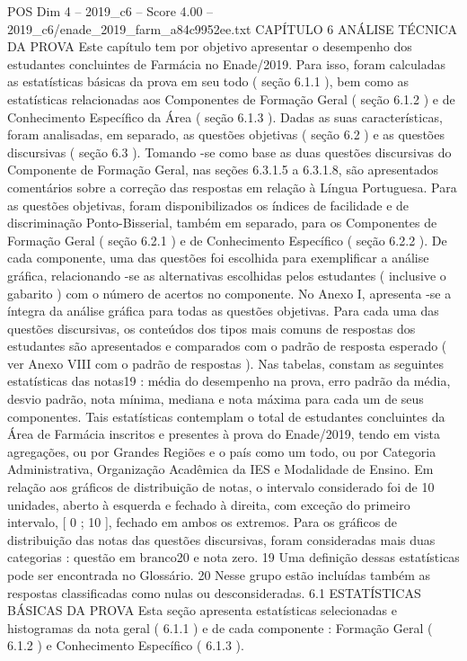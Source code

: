 \begin{textsample}{POS Dim 4 – 2019\_c6 – Score 4.00 – 2019\_c6/enade\_2019\_farm\_a84c9952ee.txt}  \label{ex:f4_pos_092}
CAPÍTULO 6 ANÁLISE TÉCNICA DA PROVA Este capítulo tem por objetivo apresentar o desempenho dos estudantes concluintes de Farmácia no Enade/2019.
Para isso, foram calculadas as estatísticas básicas da prova em seu todo ( seção 6.1.1 ), bem como as estatísticas relacionadas aos Componentes de Formação Geral ( seção 6.1.2 ) e de Conhecimento Específico da Área ( seção 6.1.3 ).
Dadas as suas características, foram analisadas, em separado, as questões objetivas ( seção 6.2 ) e as questões discursivas ( seção 6.3 ).
Tomando -se como base as duas questões discursivas do Componente de Formação Geral, nas seções 6.3.1.5 a 6.3.1.8, são apresentados comentários sobre a correção das respostas em relação à Língua Portuguesa.
Para as questões objetivas, foram disponibilizados os índices de facilidade e de discriminação Ponto-Bisserial, também em separado, para os Componentes de Formação Geral ( seção 6.2.1 ) e de Conhecimento Específico ( seção 6.2.2 ).
De cada componente, uma das questões foi escolhida para exemplificar a análise gráfica, relacionando -se as alternativas escolhidas pelos estudantes ( inclusive o gabarito ) com o número de acertos no componente.
No Anexo I, apresenta -se a íntegra da análise gráfica para todas as questões objetivas.
Para cada uma das questões discursivas, os conteúdos dos tipos mais comuns de respostas dos estudantes são apresentados e comparados com o padrão de resposta esperado ( ver Anexo VIII com o padrão de respostas ).
Nas tabelas, constam as seguintes estatísticas das notas19 : média do desempenho na prova, erro padrão da média, desvio padrão, nota mínima, mediana e nota máxima para cada um de seus componentes.
Tais estatísticas contemplam o total de estudantes concluintes da Área de Farmácia inscritos e presentes à prova do Enade/2019, tendo em vista agregações, ou por Grandes Regiões e o país como um todo, ou por Categoria Administrativa, Organização Acadêmica da IES e Modalidade de Ensino.
Em relação aos gráficos de distribuição de notas, o intervalo considerado foi de 10 unidades, aberto à esquerda e fechado à direita, com exceção do primeiro intervalo, [ 0 ; 10 ], fechado em ambos os extremos.
Para os gráficos de distribuição das notas das questões discursivas, foram consideradas mais duas categorias : questão em branco20 e nota zero. 19 Uma definição dessas estatísticas pode ser encontrada no Glossário. 20 Nesse grupo estão incluídas também as respostas classificadas como nulas ou desconsideradas. 6.1 ESTATÍSTICAS BÁSICAS DA PROVA Esta seção apresenta estatísticas selecionadas e histogramas da nota geral ( 6.1.1 ) e de cada componente : Formação Geral ( 6.1.2 ) e Conhecimento Específico ( 6.1.3 ).

\end{textsample}
